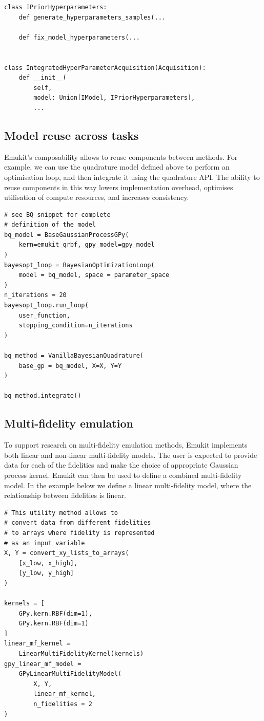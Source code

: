 \begin{verbatim}
class IPriorHyperparameters:
    def generate_hyperparameters_samples(...

    def fix_model_hyperparameters(...


class IntegratedHyperParameterAcquisition(Acquisition):
    def __init__(
        self,
        model: Union[IModel, IPriorHyperparameters],
        ...
\end{verbatim}

\subsection{Model reuse across tasks}

Emukit's composability allows to reuse components between methods. For example, we can use the quadrature model defined above to perform an optimisation loop, and then integrate it using the quadrature API. The ability to reuse components in this way lowers implementation overhead, optimises utilisation of compute resources, and increases consistency.

\begin{verbatim}
# see BQ snippet for complete
# definition of the model
bq_model = BaseGaussianProcessGPy(
    kern=emukit_qrbf, gpy_model=gpy_model
)
bayesopt_loop = BayesianOptimizationLoop(
    model = bq_model, space = parameter_space
)
n_iterations = 20
bayesopt_loop.run_loop(
    user_function,
    stopping_condition=n_iterations
)

bq_method = VanillaBayesianQuadrature(
    base_gp = bq_model, X=X, Y=Y
)

bq_method.integrate()
\end{verbatim}


\subsection{Multi-fidelity emulation}

To support research on multi-fidelity emulation methods, Emukit implements both linear and non-linear multi-fidelity models. The user is expected to provide data for each of the fidelities and make the choice of appropriate Gaussian process kernel. Emukit can then be used to define a combined multi-fidelity model. In the example below we define a linear multi-fidelity model, where the relationship between fidelities is linear.

\begin{verbatim}
# This utility method allows to
# convert data from different fidelities
# to arrays where fidelity is represented
# as an input variable
X, Y = convert_xy_lists_to_arrays(
    [x_low, x_high],
    [y_low, y_high]
)

kernels = [
    GPy.kern.RBF(dim=1),
    GPy.kern.RBF(dim=1)
]
linear_mf_kernel =
    LinearMultiFidelityKernel(kernels)
gpy_linear_mf_model =
    GPyLinearMultiFidelityModel(
        X, Y,
        linear_mf_kernel,
        n_fidelities = 2
)
\end{verbatim}

